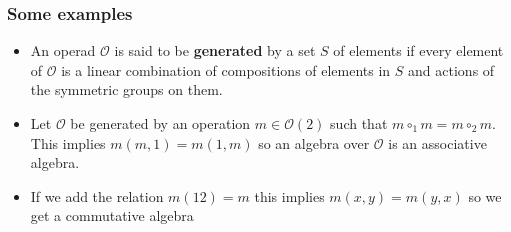 \documentclass{beamer}
\theoremstyle{definition}
\newtheorem{defi}{Definition}
\begin{document}
\begin{frame}
\frametitle{Some examples}
\begin{itemize}
\item<1-> An operad $\mathcal{O}$ is said to be \textbf{generated} by a set $S$ of elements if every element of $\mathcal{O}$ is a linear combination of compositions of elements in $S$ and actions of the symmetric groups on them.
\item<2-> Let $\mathcal{O}$ be generated by an operation $m\in\mathcal{O}(2)$ such that $m\circ_1 m=m\circ_2 m$. This implies $m(m,1)=m(1,m)$ so an algebra over $\mathcal{O}$ is an associative algebra.
\item<3-> If we add the relation $m(12)=m$ this implies $m(x,y)=m(y,x)$ so we get a commutative algebra
\end{itemize}
\end{frame}
%
%	
%	 
\end{document}
